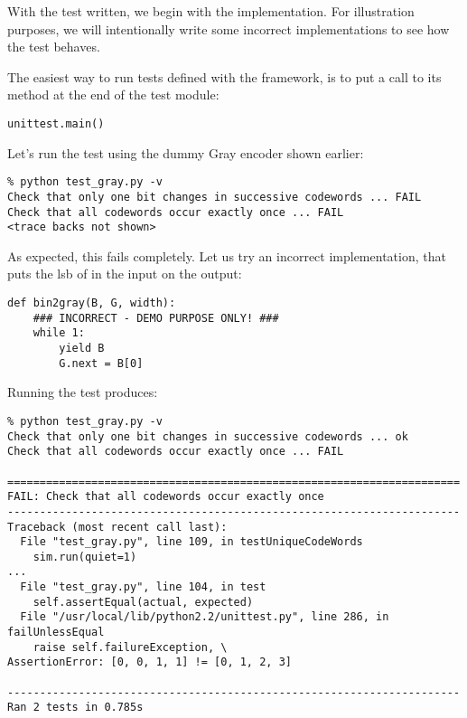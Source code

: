 With the test written, we begin with the implementation. For
illustration purposes, we will intentionally write some incorrect
implementations to see how the test behaves.

The easiest way to run tests defined with the 
framework, is to put a call to its  method at the end of
the test module:

\begin{verbatim}
unittest.main()

\end{verbatim}

Let's run the test using the dummy Gray encoder shown earlier:

\begin{verbatim}
% python test_gray.py -v
Check that only one bit changes in successive codewords ... FAIL
Check that all codewords occur exactly once ... FAIL
<trace backs not shown>

\end{verbatim}

As expected, this fails completely. Let us try an incorrect
implementation, that puts the lsb of in the input on the output:

\begin{verbatim}
def bin2gray(B, G, width):
    ### INCORRECT - DEMO PURPOSE ONLY! ###
    while 1:
        yield B
        G.next = B[0]

\end{verbatim}


Running the test produces:

\begin{verbatim}
% python test_gray.py -v
Check that only one bit changes in successive codewords ... ok
Check that all codewords occur exactly once ... FAIL

======================================================================
FAIL: Check that all codewords occur exactly once
----------------------------------------------------------------------
Traceback (most recent call last):
  File "test_gray.py", line 109, in testUniqueCodeWords
    sim.run(quiet=1)
...
  File "test_gray.py", line 104, in test
    self.assertEqual(actual, expected)
  File "/usr/local/lib/python2.2/unittest.py", line 286, in failUnlessEqual
    raise self.failureException, \
AssertionError: [0, 0, 1, 1] != [0, 1, 2, 3]

----------------------------------------------------------------------
Ran 2 tests in 0.785s

\end{verbatim}

